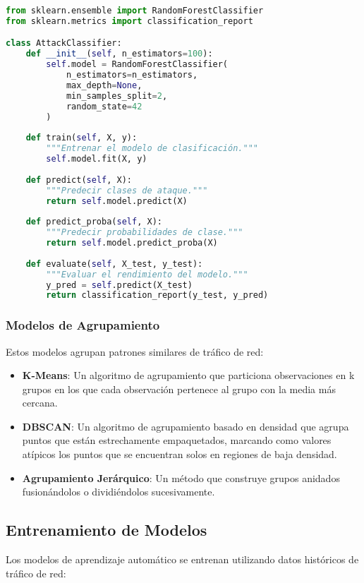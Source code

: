 \begin{lstlisting}[language=Python, caption=Implementación de Clasificador Random Forest]
from sklearn.ensemble import RandomForestClassifier
from sklearn.metrics import classification_report

class AttackClassifier:
    def __init__(self, n_estimators=100):
        self.model = RandomForestClassifier(
            n_estimators=n_estimators,
            max_depth=None,
            min_samples_split=2,
            random_state=42
        )
        
    def train(self, X, y):
        """Entrenar el modelo de clasificación."""
        self.model.fit(X, y)
        
    def predict(self, X):
        """Predecir clases de ataque."""
        return self.model.predict(X)
        
    def predict_proba(self, X):
        """Predecir probabilidades de clase."""
        return self.model.predict_proba(X)
        
    def evaluate(self, X_test, y_test):
        """Evaluar el rendimiento del modelo."""
        y_pred = self.predict(X_test)
        return classification_report(y_test, y_pred)
\end{lstlisting}

\subsubsection{Modelos de Agrupamiento}
Estos modelos agrupan patrones similares de tráfico de red:

\begin{itemize}
    \item \textbf{K-Means}: Un algoritmo de agrupamiento que particiona observaciones en k grupos en los que cada observación pertenece al grupo con la media más cercana.
    
    \item \textbf{DBSCAN}: Un algoritmo de agrupamiento basado en densidad que agrupa puntos que están estrechamente empaquetados, marcando como valores atípicos los puntos que se encuentran solos en regiones de baja densidad.
    
    \item \textbf{Agrupamiento Jerárquico}: Un método que construye grupos anidados fusionándolos o dividiéndolos sucesivamente.
\end{itemize}

\subsection{Entrenamiento de Modelos}
Los modelos de aprendizaje automático se entrenan utilizando datos históricos de tráfico de red:

